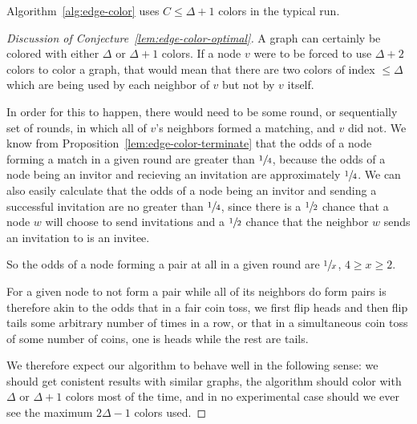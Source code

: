 \begin{con}
\label{lem:edge-color-optimal}
Algorithm~\ref{alg:edge-color} uses $C \le \Delta + 1$ colors in the typical run. 
\end{con}

\begin{proof}[Discussion of Conjecture~\ref{lem:edge-color-optimal}]

A graph can certainly be colored with either $\Delta$ or $\Delta + 1$ colors. If a node $v$ were to be forced to use $\Delta + 2$ colors to color a graph, that would mean that there are two colors of index $\le \Delta$ which are being used by each neighbor of $v$ but not by $v$ itself.

In order for this to happen, there would need to be some round, or sequentially set of rounds, in which all of $v$'s neighbors formed a matching, and $v$ did not. We know from Proposition~\ref{lem:edge-color-terminate} that the odds of a node forming a match in a given round are greater than $\sfrac{1}{4}$, because the odds of a node being an invitor and recieving an invitation are approximately $\sfrac{1}{4}$. We can also easily calculate that the odds of a node being an invitor and sending a successful invitation are no greater than $\sfrac{1}{4}$, since there is a $\sfrac{1}{2}$ chance that a node $w$ will choose to send invitations and a $\sfrac{1}{2}$ chance that the neighbor $w$ sends an invitation to is an invitee.  

So the odds of a node forming a pair at all in a given round are $\sfrac{1}{x}$, $4 \ge x \ge 2$. 

For a given node to not form a pair while all of its neighbors do form pairs is therefore akin to the odds that in a fair coin toss, we first flip heads and then flip tails some arbitrary number of times in a row, or that in a simultaneous coin toss of some number of coins, one is heads while the rest are tails. 

We therefore expect our algorithm to behave well in the following sense: we should get conistent results with similar graphs, the algorithm should color with $\Delta$ or $\Delta + 1$ colors most of the time, and in no experimental case should we ever see the maximum $2\Delta - 1$ colors used.

\end{proof}

